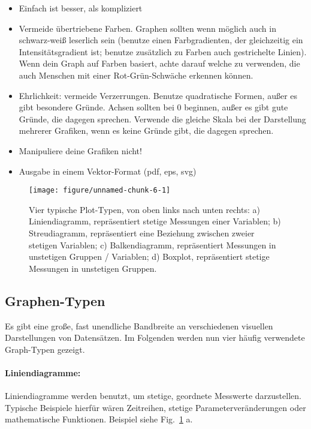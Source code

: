 \documentclass[a4paper,twoside]{tufte-book}\usepackage[]{graphicx}\usepackage[]{color}
\makeatletter
\def\maxwidth{ %
	\ifdim\Gin@nat@width>\linewidth
	\linewidth
	\else
	\Gin@nat@width
	\fi
}
\makeatother
\begin{document}
\begin{itemize}
\item Einfach ist besser, als kompliziert
\item Vermeide übertriebene Farben. Graphen sollten wenn möglich auch in schwarz-weiß leserlich sein (benutze einen Farbgradienten, der gleichzeitig ein Intensitätsgradient ist; benutze zusätzlich zu Farben auch gestrichelte Linien). Wenn dein Graph auf Farben basiert, achte darauf welche zu verwenden, die auch Menschen mit einer Rot-Grün-Schwäche erkennen können.
\item Ehrlichkeit: vermeide Verzerrungen. Benutze quadratische Formen, außer es gibt besondere Gründe. Achsen sollten bei 0 beginnen, außer es gibt gute Gründe, die dagegen sprechen. Verwende die gleiche Skala bei der Darstellung mehrerer Grafiken, wenn es keine Gründe gibt, die dagegen sprechen. 
\item Manipuliere deine Grafiken nicht!
\item Ausgabe in einem Vektor-Format (pdf, eps, svg)
\end{itemize}

\begin{figure}[htbp]
\begin{center}

\begin{Schunk}

\texttt{[image: figure/unnamed-chunk-6-1]} \end{Schunk}
\caption{Vier typische Plot-Typen, von oben links nach unten rechts: a) Liniendiagramm, repräsentiert stetige Messungen einer Variablen; b) Streudiagramm, repräsentiert eine Beziehung zwischen zweier stetigen Variablen; c) Balkendiagramm, repräsentiert Messungen in unstetigen Gruppen / Variablen; d) Boxplot, repräsentiert stetige Messungen in unstetigen Gruppen.}
\label{fig: exaple plots}
\end{center}
\end{figure}


\subsection{Graphen-Typen}

Es gibt eine große, fast unendliche Bandbreite an verschiedenen visuellen Darstellungen von Datensätzen. Im Folgenden werden nun vier häufig verwendete Graph-Typen gezeigt. 

\paragraph{Liniendiagramme:} Liniendiagramme werden benutzt, um stetige, geordnete Messwerte darzustellen. Typische Beispiele hierfür wären Zeitreihen, stetige Parameterveränderungen oder mathematische Funktionen. Beispiel siehe Fig.~\ref{fig: exaple plots} a.
\end{document}
